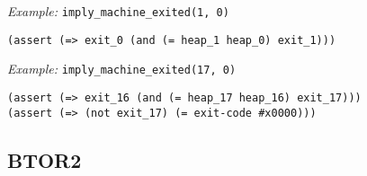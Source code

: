 \noindent
\emph{Example:} \lstinline[style=c++]{imply_machine_exited(1, 0)}

\begin{lstlisting}[language=smtlib]
(assert (=> exit_0 (and (= heap_1 heap_0) exit_1)))
\end{lstlisting}

\noindent
\emph{Example:} \lstinline[style=c++]{imply_machine_exited(17, 0)}

\begin{lstlisting}[language=smtlib]
(assert (=> exit_16 (and (= heap_17 heap_16) exit_17)))
(assert (=> (not exit_17) (= exit-code #x0000)))
\end{lstlisting}

\subsection{BTOR2}

